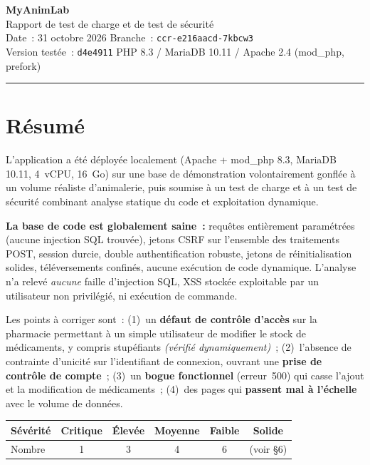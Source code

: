 \documentclass[11pt,a4paper]{article}
\begin{document}
\begin{center}
  {\LARGE\bfseries MyAnimLab}\\[2pt]
  {\large Rapport de test de charge et de test de sécurité}\\[6pt]
  \small Date~: 31 octobre 2026 \quad\textbullet\quad Branche~: \texttt{ccr-e216aacd-7kbcw3}\\
  \small Version testée~: \texttt{d4e4911} \quad\textbullet\quad PHP 8.3 / MariaDB 10.11 / Apache 2.4 (mod\_php, prefork)
\end{center}

\vspace{0.5ex}\hrule\vspace{1.5ex}

\section{Résumé}

L'application a été déployée localement (Apache + mod\_php 8.3, MariaDB 10.11,
4~vCPU, 16~Go) sur une base de démonstration volontairement gonflée à un volume
réaliste d'animalerie, puis soumise à un test de charge et à un test de
sécurité combinant analyse statique du code et exploitation dynamique.

\textbf{La base de code est globalement saine~:} requêtes entièrement
paramétrées (aucune injection SQL trouvée), jetons CSRF sur l'ensemble des
traitements POST, session durcie, double authentification robuste, jetons de
réinitialisation solides, téléversements confinés, aucune exécution de code
dynamique. L'analyse n'a relevé \emph{aucune} faille d'injection SQL, XSS
stockée exploitable par un utilisateur non privilégié, ni exécution de commande.

Les points à corriger sont~: (1)~un \textbf{défaut de contrôle d'accès} sur la
pharmacie permettant à un simple utilisateur de modifier le stock de
médicaments, y compris stupéfiants \emph{(vérifié dynamiquement)}~;
(2)~l'absence de contrainte d'unicité sur l'identifiant de connexion, ouvrant
une \textbf{prise de contrôle de compte}~; (3)~un \textbf{bogue fonctionnel}
(erreur~500) qui casse l'ajout et la modification de médicaments~; (4)~des
pages qui \textbf{passent mal à l'échelle} avec le volume de données.

\begin{center}\small
\begin{tabular}{@{}lccccc@{}}
\toprule
Sévérité & Critique & Élevée & Moyenne & Faible & \textcolor{ok}{Solide} \\
\midrule
Nombre & 1 & 3 & 4 & 6 & (voir §6) \\
\bottomrule
\end{tabular}
\end{center}
\end{document}
